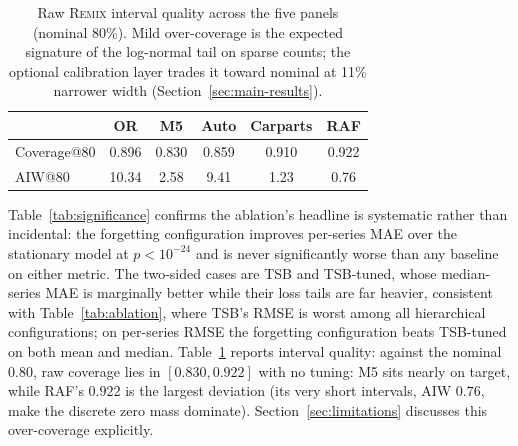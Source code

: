 \documentclass[twocolumn,10pt]{article}
\newcommand{\REMIX}{\textsc{Remix}}
\begin{document}
\begin{table}[t]
\centering
\caption{Raw \REMIX{} interval quality across the five panels (nominal
80\%). Mild over-coverage is the expected signature of the log-normal
tail on sparse counts; the optional calibration layer trades it toward
nominal at 11\% narrower width (Section~\ref{sec:main-results}).}
\label{tab:coverage}
\small
\setlength{\tabcolsep}{4.6pt}
\begin{tabular}{lccccc}
\toprule
 & OR & M5 & Auto & Carparts & RAF\\
\midrule
Coverage@80 & 0.896 & 0.830 & 0.859 & 0.910 & 0.922\\
AIW@80 & 10.34 & 2.58 & 9.41 & 1.23 & 0.76\\
\bottomrule
\end{tabular}
\end{table}

Table~\ref{tab:significance} confirms the ablation's headline is
systematic rather than incidental: the forgetting configuration improves
per-series MAE over the stationary model at $p<10^{-24}$ and is never
significantly worse than any baseline on either metric. The two-sided
cases are TSB and TSB-tuned, whose median-series MAE is marginally
better while their loss tails are far heavier, consistent with
Table~\ref{tab:ablation},
where TSB's RMSE is worst among all hierarchical configurations; on
per-series RMSE the forgetting configuration beats TSB-tuned on both
mean and median.
Table~\ref{tab:coverage} reports interval quality: against the nominal
$0.80$, raw coverage lies in $[0.830, 0.922]$ with no tuning: M5 sits
nearly on target, while RAF's $0.922$ is the largest deviation
(its very short intervals, AIW $0.76$, make the discrete zero mass
dominate). Section~\ref{sec:limitations} discusses this over-coverage
explicitly.
\end{document}
